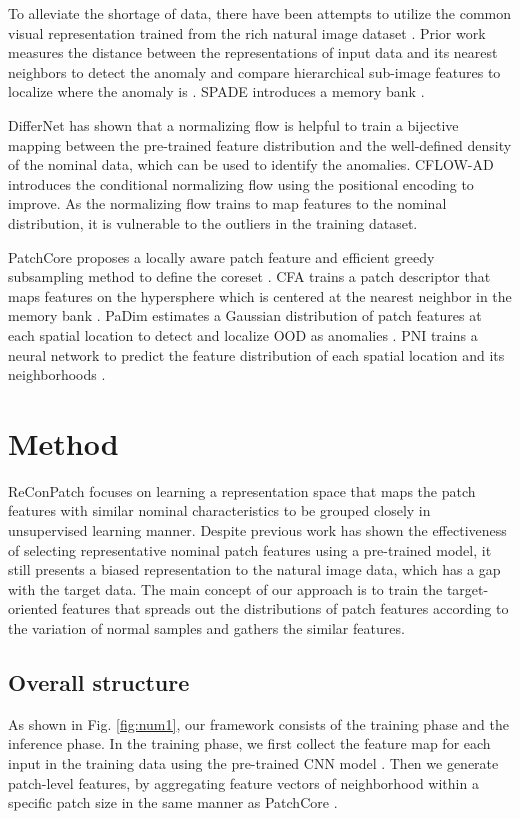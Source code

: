 \documentclass[10pt,onecolumn,letterpaper]{article}
\begin{document}
To alleviate the shortage of data, there have been attempts to utilize the common visual representation trained from the rich natural image dataset \cite{deng2009imagenet}.
Prior work measures the distance between the representations of input data and its nearest neighbors to detect the anomaly\cite{bergman2020deep} and compare hierarchical sub-image features to localize where the anomaly is \cite{cohen2020sub}.
SPADE introduces a memory bank \cite{cohen2020sub}.

DifferNet \cite{rudolph2021same} has shown that a normalizing flow \cite{dinhdensity} is helpful to train a bijective mapping between the pre-trained feature distribution and the well-defined density of the nominal data, which can be used to identify the anomalies.
CFLOW-AD \cite{gudovskiy2022cflow} introduces the conditional normalizing flow using the positional encoding to improve. As the normalizing flow trains to map features to the nominal distribution, it is vulnerable to the outliers in the training dataset.

PatchCore proposes a locally aware patch feature and efficient greedy subsampling method to define the coreset \cite{roth2022towards}.
CFA trains a patch descriptor that maps features on the hypersphere which is centered at the nearest neighbor in the memory bank \cite{lee2022cfa}.
PaDim estimates a Gaussian distribution of patch features at each spatial location to detect and localize OOD as anomalies \cite{defard2021padim}.
PNI trains a neural network to predict the feature distribution of each spatial location and its neighborhoods \cite{bae2022image}.



\section{Method}
ReConPatch focuses on learning a representation space that maps the patch features with similar nominal characteristics to be grouped closely in unsupervised learning manner. 
Despite previous work \cite{roth2022towards} has shown the effectiveness of selecting representative nominal patch features using a pre-trained model, it still presents a biased representation to the natural image data, which has a gap with the target data.
The main concept of our approach is to train the target-oriented features that spreads out the distributions of patch features according to the variation of normal samples and gathers the similar features.


\subsection{Overall structure}
As shown in Fig. \ref{fig:num1}, our framework consists of the training phase and the inference phase.
In the training phase, we first collect the feature map  for each input  in the training data using the pre-trained CNN model 
\cite{gudovskiy2022cflow,cohen2020sub,defard2021padim,roth2022towards,lee2022cfa,bae2022image}.
Then we generate patch-level features,  by aggregating feature vectors of neighborhood within a specific patch size  in the same manner as PatchCore \cite{roth2022towards}.
\end{document}
